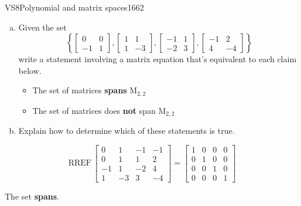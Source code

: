 \begin{exercise}{VS8}{Polynomial and matrix spaces}{1662} 
\begin{exerciseStatement} 

\begin{enumerate}[(a)]
\item  

 Given the set \[\left\{ \left[\begin{array}{cc}
0 & 0 \\
-1 & 1
\end{array}\right] , \left[\begin{array}{cc}
1 & 1 \\
1 & -3
\end{array}\right] , \left[\begin{array}{cc}
-1 & 1 \\
-2 & 3
\end{array}\right] , \left[\begin{array}{cc}
-1 & 2 \\
4 & -4
\end{array}\right] \right\}\] write a statement involving a matrix equation that's equivalent to each claim below. 

 

\begin{itemize}
\item  

 The set of matrices \textbf{spans} \(\mathrm{M}_{2,2}\) 

 
\item  

 The set of matrices does \textbf{not} span \(\mathrm{M}_{2,2}\) 

 
\end{itemize}

     
\item  

 Explain how to determine which of these statements is true. 

 
\end{enumerate}

     \end{exerciseStatement}
 \begin{exerciseAnswer} 

 \[
\mathrm{RREF}\, \left[\begin{array}{cccc}
0 & 1 & -1 & -1 \\
0 & 1 & 1 & 2 \\
-1 & 1 & -2 & 4 \\
1 & -3 & 3 & -4
\end{array}\right] = \left[\begin{array}{cccc}
1 & 0 & 0 & 0 \\
0 & 1 & 0 & 0 \\
0 & 0 & 1 & 0 \\
0 & 0 & 0 & 1
\end{array}\right]
            \] 

 

 The set \textbf{spans}. 

 \end{exerciseAnswer}
 \end{exercise}



